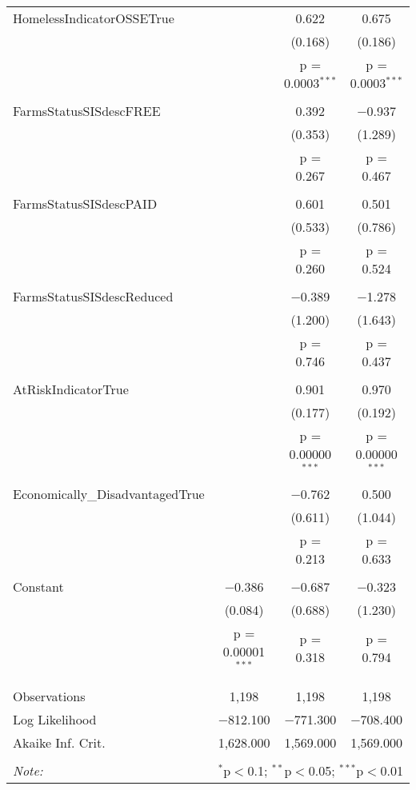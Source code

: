 \begin{table}[!htbp]
\begin{tabular}{@{\extracolsep{5pt}}lccc}
 HomelessIndicatorOSSETrue &  & 0.622 & 0.675 \\ 
  &  & (0.168) & (0.186) \\ 
  &  & p = 0.0003$^{***}$ & p = 0.0003$^{***}$ \\ 
  & & & \\ 
 FarmsStatusSISdescFREE &  & 0.392 & $-$0.937 \\ 
  &  & (0.353) & (1.289) \\ 
  &  & p = 0.267 & p = 0.467 \\ 
  & & & \\ 
 FarmsStatusSISdescPAID &  & 0.601 & 0.501 \\ 
  &  & (0.533) & (0.786) \\ 
  &  & p = 0.260 & p = 0.524 \\ 
  & & & \\ 
 FarmsStatusSISdescReduced &  & $-$0.389 & $-$1.278 \\ 
  &  & (1.200) & (1.643) \\ 
  &  & p = 0.746 & p = 0.437 \\ 
  & & & \\ 
 AtRiskIndicatorTrue &  & 0.901 & 0.970 \\ 
  &  & (0.177) & (0.192) \\ 
  &  & p = 0.00000$^{***}$ & p = 0.00000$^{***}$ \\ 
  & & & \\ 
 Economically\_DisadvantagedTrue &  & $-$0.762 & 0.500 \\ 
  &  & (0.611) & (1.044) \\ 
  &  & p = 0.213 & p = 0.633 \\ 
  & & & \\ 
 Constant & $-$0.386 & $-$0.687 & $-$0.323 \\ 
  & (0.084) & (0.688) & (1.230) \\ 
  & p = 0.00001$^{***}$ & p = 0.318 & p = 0.794 \\ 
  & & & \\ 
\hline \\[-1.8ex] 
Observations & 1,198 & 1,198 & 1,198 \\ 
Log Likelihood & $-$812.100 & $-$771.300 & $-$708.400 \\ 
Akaike Inf. Crit. & 1,628.000 & 1,569.000 & 1,569.000 \\ 
\hline 
\hline \\[-1.8ex] 
\textit{Note:}  & \multicolumn{3}{r}{$^{*}$p$<$0.1; $^{**}$p$<$0.05; $^{***}$p$<$0.01} \\ 
\end{tabular} 
\end{table} 
